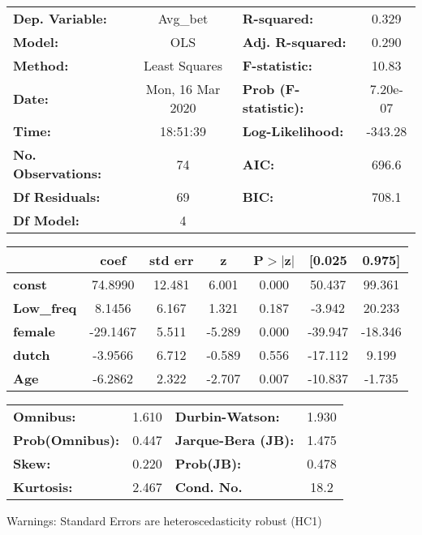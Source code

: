 \documentclass{report}
\begin{document}
\begin{center}
\begin{tabular}{lclc}
\toprule
\textbf{Dep. Variable:}    &     Avg\_bet     & \textbf{  R-squared:         } &     0.329   \\
\textbf{Model:}            &       OLS        & \textbf{  Adj. R-squared:    } &     0.290   \\
\textbf{Method:}           &  Least Squares   & \textbf{  F-statistic:       } &     10.83   \\
\textbf{Date:}             & Mon, 16 Mar 2020 & \textbf{  Prob (F-statistic):} &  7.20e-07   \\
\textbf{Time:}             &     18:51:39     & \textbf{  Log-Likelihood:    } &   -343.28   \\
\textbf{No. Observations:} &          74      & \textbf{  AIC:               } &     696.6   \\
\textbf{Df Residuals:}     &          69      & \textbf{  BIC:               } &     708.1   \\
\textbf{Df Model:}         &           4      & \textbf{                     } &             \\
\bottomrule
\end{tabular}
\begin{tabular}{lcccccc}
                   & \textbf{coef} & \textbf{std err} & \textbf{z} & \textbf{P$> |$z$|$} & \textbf{[0.025} & \textbf{0.975]}  \\
\midrule
\textbf{const}     &      74.8990  &       12.481     &     6.001  &         0.000        &       50.437    &       99.361     \\
\textbf{Low\_freq} &       8.1456  &        6.167     &     1.321  &         0.187        &       -3.942    &       20.233     \\
\textbf{female}    &     -29.1467  &        5.511     &    -5.289  &         0.000        &      -39.947    &      -18.346     \\
\textbf{dutch}     &      -3.9566  &        6.712     &    -0.589  &         0.556        &      -17.112    &        9.199     \\
\textbf{Age}       &      -6.2862  &        2.322     &    -2.707  &         0.007        &      -10.837    &       -1.735     \\
\bottomrule
\end{tabular}
\begin{tabular}{lclc}
\textbf{Omnibus:}       &  1.610 & \textbf{  Durbin-Watson:     } &    1.930  \\
\textbf{Prob(Omnibus):} &  0.447 & \textbf{  Jarque-Bera (JB):  } &    1.475  \\
\textbf{Skew:}          &  0.220 & \textbf{  Prob(JB):          } &    0.478  \\
\textbf{Kurtosis:}      &  2.467 & \textbf{  Cond. No.          } &     18.2  \\
\bottomrule
\end{tabular}
\end{center}

Warnings: \newline
 [1] Standard Errors are heteroscedasticity robust (HC1)
\end{document}

